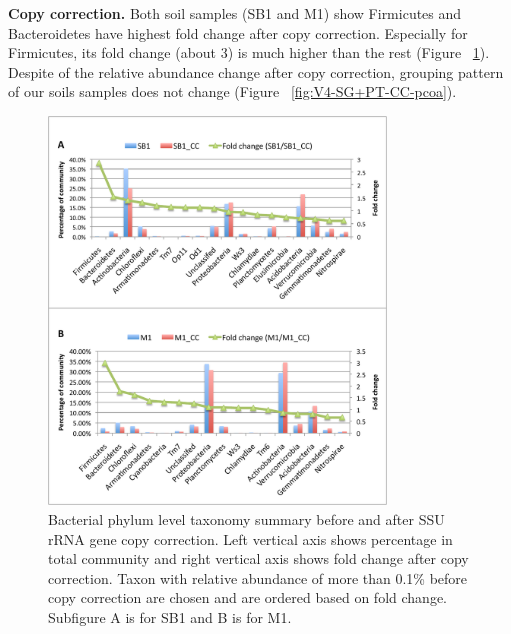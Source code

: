 \documentclass[12pt]{article}
\begin{document}
{\bf Copy correction. }  Both soil samples (SB1 and M1) show
Firmicutes and Bacteroidetes have highest fold change after copy
correction. Especially for Firmicutes, its fold change (about 3) is
much higher than the rest (Figure ~\ref{fig:SB1+M1_cc}). Despite of
the relative abundance change after copy correction, grouping pattern
of our soils samples does not change (Figure
~\ref{fig:V4-SG+PT-CC-pcoa}).

\begin{figure}[tbph!]
  \centering
  \includegraphics[width=0.8\textwidth]{figs/SB1+M1_cc}

  \caption[Taxonomy summary before and after SSU rRNA gene copy
  correction]{Bacterial phylum level taxonomy summary before and after
  SSU rRNA gene copy correction. Left vertical axis shows percentage
  in total community and right vertical axis shows fold change after
  copy correction. Taxon with relative abundance of more than 0.1\%
  before copy correction are chosen and are ordered based on fold
  change. Subfigure A is for SB1 and B is for M1.}

  \label{fig:SB1+M1_cc}
\end{figure}
\end{document}
